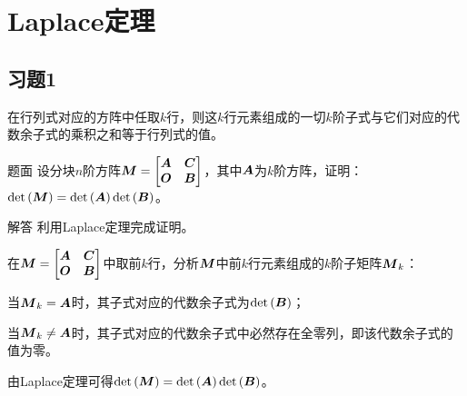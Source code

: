 \documentclass[9pt,xcolor=svgnames]{beamer} %
\begin{document}
\section{Laplace定理}

\subsection*{习题1}
\begin{frame}
    \begin{theorem}[Laplace定理]
        在行列式对应的方阵中任取\(k\)行，则这\(k\)行元素组成的一切\(k\)阶子式与它们对应的代数余子式的乘积之和等于行列式的值。
    \end{theorem}
    \pause
    \begin{block}{题面}
        设分块\(n\)阶方阵\(\boldsymbol{M}=\begin{bmatrix}\boldsymbol{A}&\boldsymbol{C}\\\boldsymbol{O}&\boldsymbol{B}\end{bmatrix}\)，其中\(\boldsymbol{A}\)为\(k\)阶方阵，证明：\(\mathrm{det}\left( \boldsymbol{M} \right)=\mathrm{det}\left( \boldsymbol{A} \right)\mathrm{det}\left( \boldsymbol{B} \right)\)。
    \end{block}
    \pause
    \begin{block}{解答}
        利用Laplace定理完成证明。

        在\(\boldsymbol{M}=\begin{bmatrix}\boldsymbol{A}&\boldsymbol{C}\\\boldsymbol{O}&\boldsymbol{B}\end{bmatrix}\)中取前\(k\)行，分析\(\boldsymbol{M}\)中前\(k\)行元素组成的\(k\)阶子矩阵\(\boldsymbol{M}_k\)：
        \pause

        当\(\boldsymbol{M}_k=\boldsymbol{A}\)时，其子式对应的代数余子式为\(\mathrm{det}\left( \boldsymbol{B} \right)\)；

        当\(\boldsymbol{M}_k\neq\boldsymbol{A}\)时，其子式对应的代数余子式中必然存在全零列，即该代数余子式的值为零。

        由Laplace定理可得\(\mathrm{det}\left( \boldsymbol{M} \right)=\mathrm{det}\left( \boldsymbol{A} \right)\mathrm{det}\left( \boldsymbol{B} \right)\)。
    \end{block}
\end{frame}
\end{document}
